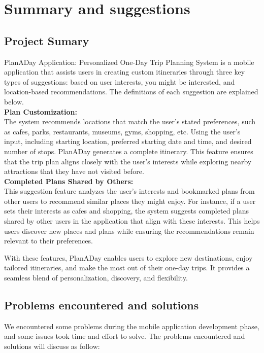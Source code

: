 \chapter{Summary and suggestions}
\section{Project Sumary}
PlanADay Application: Personalized One-Day Trip Planning System is a mobile application that
assists users in creating custom itineraries through three key types of suggestions: based on user
interests, you might be interested, and location-based recommendations. The definitions of each
suggestion are explained below.\vspace{1cm} \\
\textbf{Plan Customization:} \\
The system recommends locations that match the user’s stated preferences, such as cafes, parks,
restaurants, museums, gyms, shopping, etc. Using the user's input, including starting location,
preferred starting date and time, and desired number of stops. PlanADay generates a complete
itinerary. This feature ensures that the trip plan aligns closely with the user’s interests while
exploring nearby attractions that they have not visited before. \vspace{1cm} \\
\textbf{Completed Plans Shared by Others:} \\
This suggestion feature analyzes the user’s interests and bookmarked plans from other users to
recommend similar places they might enjoy. For instance, if a user sets their interests as cafes
and shopping, the system suggests completed plans shared by other users in the application that
align with these interests. This helps users discover new places and plans while ensuring the
recommendations remain relevant to their preferences.\par
With these features, PlanADay enables users to explore new destinations, enjoy tailored
itineraries, and make the most out of their one-day trips. It provides a seamless blend of
personalization, discovery, and flexibility.
\newpage

\section{Problems encountered and solutions}
We encountered some problems during the mobile application development phase, and some
issues took time and effort to solve. The problems encountered and solutions will discuss as
follow:
